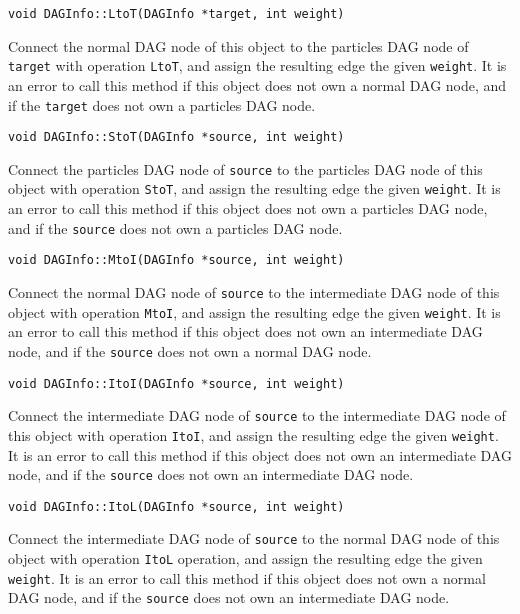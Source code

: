 \begin{lstlisting}
void DAGInfo::LtoT(DAGInfo *target, int weight)
\end{lstlisting}

\noindent Connect the normal DAG node of this object to the particles DAG
node of \texttt{target} with operation \texttt{LtoT}, and assign the
resulting edge the given \texttt{weight}. It is an error to call this method
if this object does not own a normal DAG node, and if the \texttt{target}
does not own a particles DAG node.

\begin{lstlisting}
void DAGInfo::StoT(DAGInfo *source, int weight)
\end{lstlisting}

\noindent Connect the particles DAG node of \texttt{source} to the particles
DAG node of this object with operation \texttt{StoT}, and assign the
resulting edge the given \texttt{weight}. It is an error to call this method
if this object does not own a particles DAG node, and if the \texttt{source}
does not own a particles DAG node.

\begin{lstlisting}
void DAGInfo::MtoI(DAGInfo *source, int weight)
\end{lstlisting}

\noindent Connect the normal DAG node of \texttt{source} to the intermediate
DAG node of this object with operation \texttt{MtoI}, and assign the
resulting edge the given \texttt{weight}. It is an error to call this method
if this object does not own an intermediate DAG node, and if the
\texttt{source} does not own a normal DAG node.

\begin{lstlisting}
void DAGInfo::ItoI(DAGInfo *source, int weight)
\end{lstlisting}

\noindent Connect the intermediate DAG node of \texttt{source} to the
intermediate DAG node of this object with operation \texttt{ItoI}, and
assign the resulting edge the given \texttt{weight}. It is an error to call
this method if this object does not own an intermediate DAG node, and if the
\texttt{source} does not own an intermediate DAG node.

\begin{lstlisting}
void DAGInfo::ItoL(DAGInfo *source, int weight)
\end{lstlisting}

\noindent Connect the intermediate DAG node of \texttt{source} to the normal
DAG node of this object with operation \texttt{ItoL} operation, and assign
the resulting edge the given \texttt{weight}. It is an error to call this
method if this object does not own a normal DAG node, and if the
\texttt{source} does not own an intermediate DAG node.



